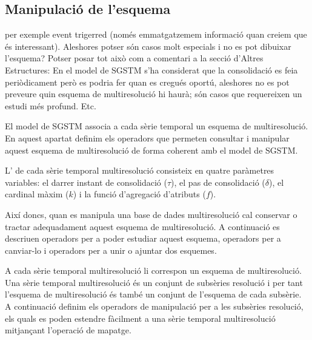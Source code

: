 \subsection{Manipulació de l'esquema}
\label{sec:model:sgstm-manipulacio-esquema}
per exemple event trigerred (només emmatgatzemem informació quan creiem que és interessant). Aleshores potser són casos molt especials i no es pot dibuixar l'esquema? Potser posar tot això com a comentari a la secció d'Altres Estructures: En el model de SGSTM s'ha considerat que la consolidació es feia periòdicament però es podria fer quan es cregués oportú, aleshores no es pot preveure quin esquema de multiresolució hi haurà; són casos que requereixen un estudi més profund. Etc.




El model de SGSTM associa a cada sèrie temporal un esquema de
multiresolució. En aquest apartat definim els operadors que permeten
consultar i manipular aquest esquema de multiresolució de forma
coherent amb el model de SGSTM.

L' de
cada sèrie temporal multiresolució consisteix en quatre paràmetres
variables: el darrer instant de consolidació ($\tau$), el pas de
consolidació ($\delta$), el cardinal màxim ($k$) i la funció
d'agregació d'atributs ($f$).

Així doncs, quan es manipula una base de dades multiresolució cal
conservar o tractar adequadament aquest esquema de multiresolució.  A
continuació es descriuen operadors per a poder estudiar aquest
esquema, operadors per a canviar-lo i operadors per a unir o ajuntar
dos esquemes.


A cada sèrie temporal multiresolució li correspon un esquema de
multiresolució.  Una sèrie temporal multiresolució és un conjunt de
subsèries resolució i per tant l'esquema de multiresolució és també un
conjunt de l'esquema de cada subsèrie.  A continuació definim els
operadors de manipulació per a les subsèries resolució, els quals es
poden estendre fàcilment a una sèrie temporal multiresolució
mitjançant l'operació de mapatge.




